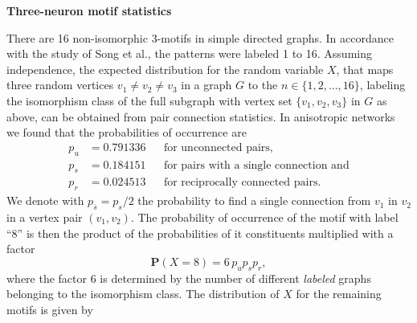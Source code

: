 {\bf Three-neuron motif statistics}

There are 16 %
non-isomorphic 3-motifs %
in simple directed graphs. In accordance with the study of Song et
al., the patterns were labeled 1 to 16. Assuming independence, the
expected distribution for the random variable $X$, that maps three
random vertices $v_1 \neq v_2 \neq v_3$ in a graph $G$ to the $n \in
\{1,2,\dots,16\}$, labeling the isomorphism class of the full subgraph
with vertex set $\{v_1,v_2,v_3\}$ in $G$ as above, can be obtained
from pair connection statistics. In anisotropic networks we found that
the probabilities of occurrence are
\begin{align*} 
  p_u & = 0.791336     &&\text{for unconnected pairs,}     \\
  p_s & = 0.184151     &&\text{for pairs with a single connection and} \\
  p_r & = 0.024513     &&\text{for reciprocally connected pairs.}
\end{align*}
We denote with $p_{\bar{s}} = p_s/2$ the probability to find a single
connection from $v_1$ in $v_2$ in a vertex pair $(v_1,v_2)$. The
probability of occurrence of the motif with label \enquote{8} is then
the product of the probabilities of it constituents multiplied with a
factor
\[
  \mathbf{P}(X=8) = 6\, p_{u} p_{s} p_{r},
\]
where the factor 6 is determined by the number of different
\textit{labeled} graphs belonging to the isomorphism class. The
distribution of $X$ for the remaining motifs is given by \\
%
\smallskip
%
